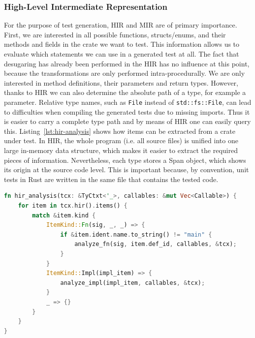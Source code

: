 \documentclass{article}
\begin{document}
\subsubsection{High-Level Intermediate Representation}
For the purpose of test generation, \ac{HIR} and \ac{MIR} are of primary importance. First, we are interested in all possible functions, structs/enums, and their methods and fields in the crate we want to test. This information allows us to evaluate which statements we can use in a generated test at all. The fact that desugaring has already been performed in the \ac{HIR} has no influence at this point, because the transformations are only performed intra-procedurally. We are only interested in method definitions, their parameters and return types. However, thanks to \ac{HIR} we can also determine the absolute path of a type, for example a parameter. Relative type names, such as \lstinline{File} instead of \lstinline{std::fs::File}, can lead to difficulties when compiling the generated tests due to missing imports. Thus it is easier to carry a complete type path and by means of \ac{HIR} one can easily query this. Listing~\ref{lst:hir-analysis} shows how items can be extracted from a crate under test. In \ac{HIR}, the whole program (i.e. all source files) is unified into one large in-memory data structure, which makes it easier to extract the required pieces of information. Nevertheless, each type stores a Span object, which shows its origin at the source code level. This is important because, by convention, unit tests in Rust are written in the same file that contains the tested code.

\begin{lstlisting}[language=Rust, style=boxed, caption={Iterate over the items in the HIR of a crate}, label=lst:hir-analysis]
fn hir_analysis(tcx: &TyCtxt<'_>, callables: &mut Vec<Callable>) {
    for item in tcx.hir().items() {
        match &item.kind {
            ItemKind::Fn(sig, _, _) => {
                if &item.ident.name.to_string() != "main" {
                    analyze_fn(sig, item.def_id, callables, &tcx);
                }
            }
            ItemKind::Impl(impl_item) => {
                analyze_impl(impl_item, callables, &tcx);
            }
            _ => {}
        }
    }
}
\end{lstlisting}
\end{document}
